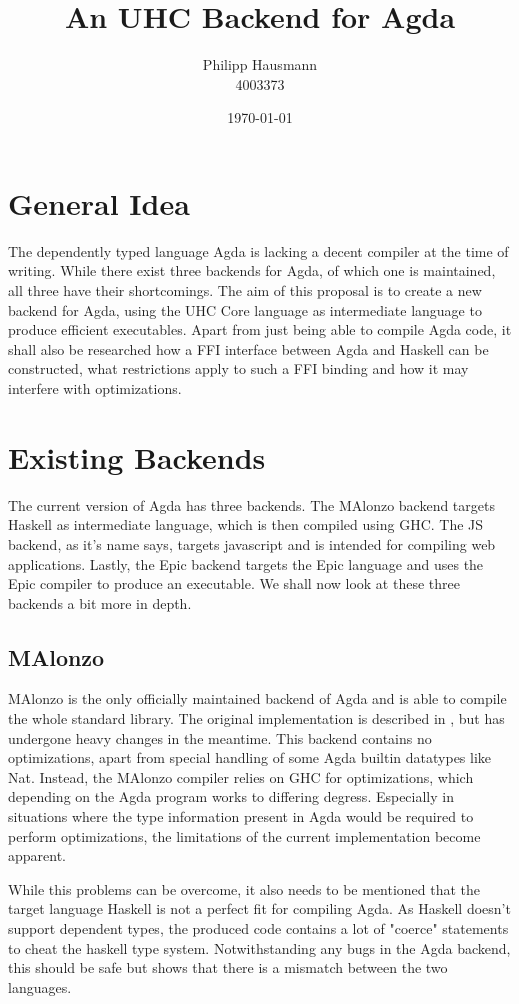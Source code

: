 \documentclass[12pt, a4paper, twoside]{report}
\title{An UHC Backend for Agda}
\author{Philipp Hausmann \\
    4003373 \\
    }
\date{\today}
\begin{document}
\maketitle

\tableofcontents

\chapter{General Idea}
The dependently typed language Agda is lacking a decent compiler at the time of writing. While there
exist three backends for Agda, of which one is maintained, all three have their shortcomings.
The aim of this proposal is to create a new backend for Agda, using the UHC Core language
as intermediate language to produce efficient executables. Apart from just being able to compile
Agda code, it shall also be researched how a FFI interface between Agda and Haskell can be constructed,
what restrictions apply to such a FFI binding and how it may interfere with optimizations.

\chapter{Existing Backends}
The current version of Agda has three backends. The MAlonzo backend targets Haskell as intermediate
language, which is then compiled using GHC. The JS backend, as it's name says, targets javascript
and is intended for compiling web applications. Lastly, the Epic backend targets the Epic language
and uses the Epic compiler to produce an executable.
We shall now look at these three backends a bit more in depth.


\section{MAlonzo}
MAlonzo is the only officially maintained backend of Agda and is able to compile the whole standard
library. The original implementation is described in \cite{benke2007alonzo}, but has undergone
heavy changes in the meantime.
This backend contains no optimizations, apart from special handling of some Agda builtin
datatypes like Nat. Instead, the MAlonzo compiler relies on GHC for optimizations, which depending
on the Agda program works to differing degress. Especially in situations where the type information
present in Agda would be required to perform optimizations, the limitations of the current implementation
become apparent.

While this problems can be overcome, it also needs to be mentioned that the target language Haskell
is not a perfect fit for compiling Agda. As Haskell doesn't support dependent types, the produced
code contains a lot of "coerce" statements to cheat the haskell type system. Notwithstanding any
bugs in the Agda backend, this should be safe but shows that there is a mismatch between the
two languages.
\end{document}
